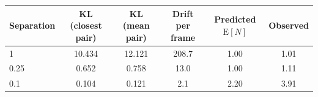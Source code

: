 \begin{tabular}{lccccc}\toprule
Separation & KL (closest pair) & KL (mean pair) & Drift per frame & Predicted $\mathrm{E}[N]$ & Observed \\\midrule
1 & 10.434 & 12.121 & 208.7 & 1.00 & 1.01 \\
0.25 & 0.652 & 0.758 & 13.0 & 1.00 & 1.11 \\
0.1 & 0.104 & 0.121 & 2.1 & 2.20 & 3.91 \\
\bottomrule\end{tabular}
